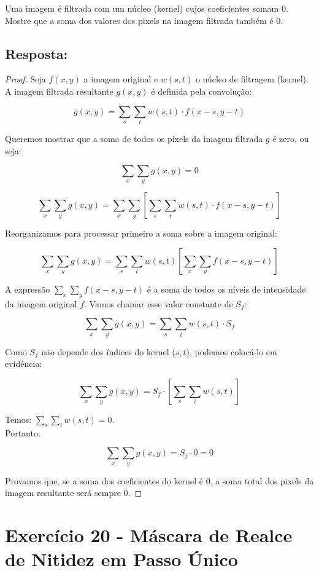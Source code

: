 \documentclass[a4paper,12pt]{article}
\begin{document}
Uma imagem é filtrada com um núcleo (kernel) cujos coeficientes somam 0. Mostre que a soma dos
valores dos pixels na imagem filtrada também é 0.


\subsection*{Resposta:}

\bigskip

\begin{proof}

Seja $f(x, y)$ a imagem original e $w(s, t)$ o núcleo de filtragem (kernel). A imagem filtrada resultante $g(x, y)$ é definida pela convolução:

$$g(x, y) = \sum_{s} \sum_{t} w(s, t) \cdot f(x-s, y-t)$$

Queremos mostrar que a soma de todos os pixels da imagem filtrada $g$ é zero, ou seja:


$$\sum_{x} \sum_{y} g(x, y) = 0$$


$$\sum_{x} \sum_{y} g(x, y) = \sum_{x} \sum_{y} \left[ \sum_{s} \sum_{t} w(s, t) \cdot f(x-s, y-t) \right]$$


Reorganizamos para processar primeiro a soma sobre a imagem original:

$$\sum_{x} \sum_{y} g(x, y) = \sum_{s} \sum_{t} w(s, t) \left[ \sum_{x} \sum_{y} f(x-s, y-t) \right]$$


A expressão $\sum_{x} \sum_{y} f(x-s, y-t)$ é a soma de todos os níveis de intensidade da imagem original $f$. Vamos chamar esse valor constante de $S_f$:


$$\sum_{x} \sum_{y} g(x, y) = \sum_{s} \sum_{t} w(s, t) \cdot S_f$$

Como $S_f$ não depende dos índices do kernel ($s, t$), podemos colocá-lo em evidência:


$$\sum_{x} \sum_{y} g(x, y) = S_f \cdot \left[ \sum_{s} \sum_{t} w(s, t) \right]$$

Temos: $\sum_{s} \sum_{t} w(s, t) = 0$.\\ 

Portanto:

$$\sum_{x} \sum_{y} g(x, y) = S_f \cdot 0 = 0$$


Provamos que, se a soma dos coeficientes do kernel é 0, a soma total dos pixels da imagem resultante será sempre 0.

\end{proof}


\newpage
\section*{Exercício 20 - Máscara de Realce de Nitidez em Passo Único}
\end{document}
